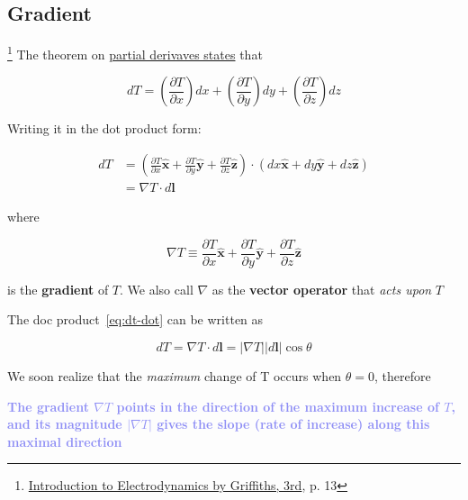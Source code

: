 \subsection{Gradient}

\footnote{\href{https://trello.com/c/U6HhhDq6}{Introduction to Electrodynamics by Griffiths, 3rd}, p. 13} The theorem
on \hyperref[eq:partial-chain-rule]{partial derivaves states} that

\begin{equation}
    dT = \left( \frac{\partial T}{\partial x} \right) dx + \left( \frac{\partial T}{\partial y} \right) dy + \left( \frac{\partial T}{\partial z} \right) dz
\end{equation}

Writing it in the dot product form:

\begin{align}
    dT &= \left( \frac{\partial T}{\partial x}\boldsymbol{\hat{x}} + \frac{\partial T}{\partial y}\boldsymbol{\hat{y}} + \frac{\partial T}{\partial z}\boldsymbol{\hat{z}} \right) \cdot (dx\boldsymbol{\hat{x}} + dy\boldsymbol{\hat{y}} + dz\boldsymbol{\hat{z}}) \\
      &= \nabla T \cdot d\boldsymbol{l} \label{eq:dt-dot}
\end{align}

where

\begin{equation}\label{eq:def-gradient}
    \nabla T \equiv \frac{\partial T}{\partial x}\boldsymbol{\hat{x}} + \frac{\partial T}{\partial y}\boldsymbol{\hat{y}} + \frac{\partial T}{\partial z}\boldsymbol{\hat{z}}
\end{equation}

is the \textbf{gradient} of $T$. We also call $\nabla$ as the \textbf{vector operator} that \textit{acts upon} $T$

\begin{tcolorbox}[
    parbox=false,
    colbacktitle=red!10!white,
    colback=blue!10!white,coltitle=red!70!black,
    title=The Geometrical Interpretation of the Gradient
]
    The doc product~\ref{eq:dt-dot} can be written as

    \begin{equation}
        dT = \nabla T \cdot d\boldsymbol{l} = \vert \nabla T \vert \vert d\boldsymbol{l} \vert \cos{\theta}
    \end{equation}

    We soon realize that the \textit{maximum} change of T occurs when $\theta = 0$, therefore

    \begin{tcolorbox}[colback=red!10!white]
        \begin{center}
            \textcolor[HTML]{8F8FF5}{\textbf{The gradient $\nabla T$ points in the direction of the maximum increase of $T$,
            and its magnitude $\vert \nabla T \vert$ gives the slope (rate of increase) along this maximal direction}}
        \end{center}
    \end{tcolorbox}
\end{tcolorbox}


